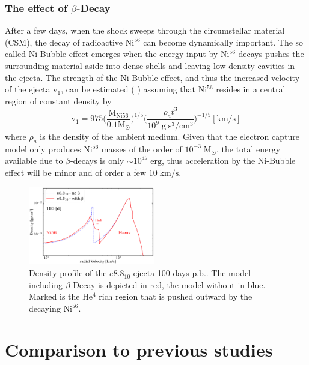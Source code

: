 \documentclass[fleqn,usenatbib]{mnras}
\newcommand{\helium}{$\mathrm{He^{4}}$\xspace}
\newcommand{\nickel}{$\mathrm{Ni^{56}}$\xspace}
\begin{document}
\subsubsection{The effect of $\beta$-Decay}
After a few days, when the shock sweeps through the circumstellar material (CSM), the decay of radioactive \nickel can become dynamically important. The so called Ni-Bubble effect emerges when the energy input by \nickel decays pushes the surrounding material aside into dense shells and leaving low density cavities in the ejecta. The strength of the Ni-Bubble effect, and thus the increased velocity of the ejecta $\mathrm{v}_1$,  can be estimated (\cite{Chevalier2005} ) assuming that \nickel resides in a central region of constant density by
\begin{equation}
\mathrm{v_1} = 975\Big(\frac{\mathrm{M_{Ni56}}}{0.1\mathrm{M_{\odot}}} \Big)^{1/5} \Big( \frac{\rho_a t^3} {10^9 \mathrm{\;g\;s^3/cm^3}}\Big)^{-1/5} \mathrm{[km/s]}
\end{equation}
where $\rho_a$ is the density of the ambient medium. Given that the electron capture model only produces \nickel masses of the order of $10^{-3}\;\mathrm{M_{\odot}}$, the total energy available due to $\beta$-decays is only $\sim 10^{47}\;\mathrm{erg}$, thus acceleration by the Ni-Bubble effect will be minor and of order a few $10\;\mathrm{km/s}$.

\begin{figure}
 \label{fig:e8_beta}
 \centering
 \includegraphics[width=0.49\textwidth]{./pic/e8_10_beta_nobeta_den_vs_vr.pdf}
 \caption{Density profile of the $e8.8_{10}$ ejecta 100 days p.b.. The model including $\beta$-Decay is depicted in red, the model without in blue. Marked is the \helium rich region that is pushed outward by the decaying \nickel. }
\end{figure}

\section{Comparison to previous studies}
\label{sec:Comparison to previous studies}
\end{document}
